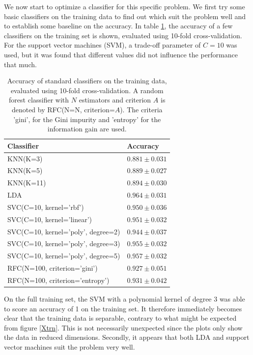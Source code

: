 \documentclass [a4paper] {report}
\begin{document}
	We now start to optimize a classifier for this specific problem. We first try some basic classifiers on the training data to find out which suit the problem well and to establish some baseline on the accuracy. In table \ref{tab:basic}, the accuracy of a few classifiers on the training set is shown, evaluated using 10-fold cross-validation. For the support vector machines (SVM), a trade-off parameter of $C=10$ was used, but it was found that different values did not influence the performance that much.
	
	\begin{table}[H]
		\centering
		\caption{Accuracy of standard classifiers on the training data, evaluated using 10-fold cross-validation. A random forest classifier with $N$ estimators and criterion $A$ is denoted by RFC(N=N, criterion=$A$). The criteria 'gini', for the Gini impurity and 'entropy' for the information gain are used.}
		\label{tab:basic}
		\begin{tabular}{l|l}
			Classifier 							& Accuracy  \\ \hline
			KNN(K=3)						 	& $0.881 \pm 0.031 $\\
			KNN(K=5) 							& $0.889 \pm 0.027 $\\
			KNN(K=11) 							& $0.894 \pm 0.030 $\\
			LDA 								& $0.964 \pm 0.031 $\\
			SVC(C=10, kernel='rbf') 			& $0.950 \pm 0.036 $\\
			SVC(C=10, kernel='linear') 			& $0.951 \pm 0.032 $\\
			SVC(C=10, kernel='poly', degree=2) 	& $0.944 \pm 0.037 $\\
			SVC(C=10, kernel='poly', degree=3) 	& $0.955 \pm 0.032 $\\
			SVC(C=10, kernel='poly', degree=5) 	& $0.957 \pm 0.032 $\\
			RFC(N=100, criterion='gini')		& $0.927 \pm 0.051 $\\
			RFC(N=100, criterion='entropy')		& $0.931 \pm 0.042 $\\
		\end{tabular}		
	\end{table}
	
	\noindent
	On the full training set, the SVM with a polynomial kernel of degree 3 was able to score an accuracy of 1 on the training set. It therefore immediately becomes clear that the training data is separable, contrary to what might be expected from figure \ref{Xtrn}. This is not necessarily unexpected since the plots only show the data in reduced dimensions. Secondly, it appears that both LDA and support vector machines suit the problem very well.\\
	
\end{document}
